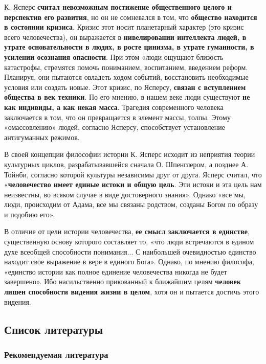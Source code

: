 \documentclass{article}
\begin{document}
\begin{flushleft}
\hfill

К. Ясперс \textbf{считал невозможным постижение общественного целого и перспектив его развития}, но он не сомневался в том, что \textbf{общество находится в состоянии кризиса}. Кризис этот носит планетарный характер (это кризис всего человечества), он выражается в \textbf{нивелировании интеллекта людей, в утрате основательности в людях, в росте цинизма, в утрате гуманности, в усилении осознания опасности}. При этом «люди ощущают близость катастрофы, стремятся помочь пониманием, воспитанием, введением реформ. Планируя, они пытаются овладеть ходом событий, восстановить необходимые условия или создать новые. Этот кризис, по Ясперсу, \textbf{связан с вступлением общества в век техники}. По его мнению, в нашем веке люди существуют \textbf{не как индивиды, а как некая масса}. Трагедия современного человека заключается в том, что он превращается в элемент массы, толпы. Этому «омассовлению» людей, согласно Ясперсу, способствует установление антигуманных режимов.

\hfill

В своей концепции философии истории К. Ясперс исходит из неприятия теории культурных циклов, разрабатывавшейся сначала О. Шпенглером, а позднее А. Тойнби, согласно которой культуры независимы друг от друга. Ясперс считал, что «\textbf{человечество имеет единые истоки и общую цель}. Эти истоки и эта цель нам неизвестны, во всяком случае в виде достоверного знания». Однако «все мы, люди, происходим от Адама, все мы связаны родством, созданы Богом по образу и подобию его».

\hfill

В отличие от цели истории человечества, \textbf{ее смысл заключается в единстве}, существенную основу которого составляет то, «что люди встречаются в едином духе всеобщей способности понимания... С наибольшей очевидностью единство находит свое выражение в вере в единого Бога». Однако, по мнению философа, «единство истории как полное единение человечества никогда не будет завершено». Ибо насильственно прикованный к ближайшим целям \textbf{человек лишен способности видения жизни в целом}, хотя он и пытается достичь этого видения.

\end{flushleft}

\pagebreak
\subsection{Список литературы}

\subsubsection{Рекомендуемая литература}
\end{document}
